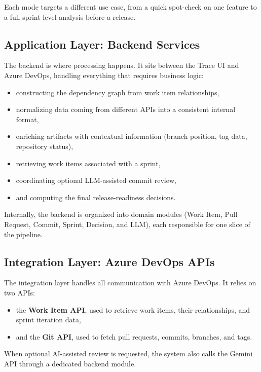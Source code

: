 Each mode targets a different use case, from a quick spot-check on one feature to a full sprint-level analysis before a release.

\subsection{Application Layer: Backend Services}

The backend is where processing happens. It sits between the Trace UI and Azure DevOps, handling everything that requires business logic:

\begin{itemize}
    \item constructing the dependency graph from work item relationships,
    \item normalizing data coming from different APIs into a consistent internal format,
    \item enriching artifacts with contextual information (branch position, tag data, repository status),
    \item retrieving work items associated with a sprint,
    \item coordinating optional LLM-assisted commit review,
    \item and computing the final release-readiness decisions.
\end{itemize}

Internally, the backend is organized into domain modules (Work Item, Pull Request, Commit, Sprint, Decision, and LLM), each responsible for one slice of the pipeline.

\subsection{Integration Layer: Azure DevOps APIs}

The integration layer handles all communication with Azure DevOps. It relies on two APIs:

\begin{itemize}
    \item the \textbf{Work Item API}, used to retrieve work items, their relationships, and sprint iteration data,
    \item and the \textbf{Git API}, used to fetch pull requests, commits, branches, and tags.
\end{itemize}

When optional AI-assisted review is requested, the system also calls the Gemini API through a dedicated backend module.

